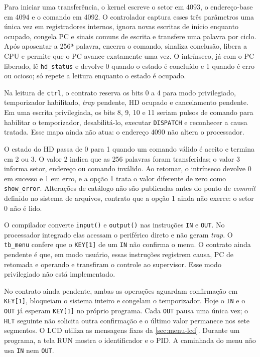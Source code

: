 \documentclass[
    12pt,
    openright,
    a4paper,
    english,
    brazilian
]{abntex2}
\begin{document}
Para iniciar uma transferência, o kernel escreve o setor em 4093, o endereço-base em 4094 e o comando em 4092. O controlador captura esses três parâmetros uma única vez em registradores internos, ignora novas escritas de início enquanto ocupado, congela PC e sinais comuns de escrita e transfere uma palavra por ciclo. Após aposentar a 256ª palavra, encerra o comando, sinaliza conclusão, libera a CPU e permite que o PC avance exatamente uma vez. O intrínseco, já com o PC liberado, lê \texttt{hd\_status} e devolve 0 quando o estado é concluído e 1 quando é erro ou ocioso; só repete a leitura enquanto o estado é ocupado.

Na leitura de \texttt{ctrl}, o contrato reserva os bits 0 a 4 para modo privilegiado, temporizador habilitado, \emph{trap} pendente, HD ocupado e cancelamento pendente. Em uma escrita privilegiada, os bits 8, 9, 10 e 11 seriam pulsos de comando para habilitar o temporizador, desabilitá-lo, executar \texttt{DISPATCH} e reconhecer a causa tratada. Esse mapa ainda não atua: o endereço 4090 não altera o processador.

O estado do HD passa de 0 para 1 quando um comando válido é aceito e termina em 2 ou 3. O valor 2 indica que as 256 palavras foram transferidas; o valor 3 informa setor, endereço ou comando inválido. Ao retomar, o intrínseco devolve 0 em sucesso e 1 em erro, e a opção 1 trata o valor diferente de zero como \texttt{show\_error}. Alterações de catálogo não são publicadas antes do ponto de \emph{commit} definido no sistema de arquivos, contrato que a opção 1 ainda não exerce: o setor 0 não é lido.

O compilador converte \texttt{input()} e \texttt{output()} nas instruções \texttt{IN} e \texttt{OUT}. No processador integrado elas acessam o periférico direto e não geram \emph{trap}. O \texttt{tb\_menu} confere que o \texttt{KEY[1]} de um \texttt{IN} não confirma o menu. O contrato ainda pendente é que, em modo usuário, essas instruções registrem causa, PC de retomada e operando e transfiram o controle ao supervisor. Esse modo privilegiado não está implementado.

No contrato ainda pendente, ambas as operações aguardam confirmação em \texttt{KEY[1]}, bloqueiam o sistema inteiro e congelam o temporizador. Hoje o \texttt{IN} e o \texttt{OUT} já esperam \texttt{KEY[1]} no próprio programa. Cada \texttt{OUT} pausa uma única vez; o \texttt{HLT} seguinte não solicita outra confirmação e o último valor permanece nos sete segmentos. O LCD utiliza as mensagens fixas da \autoref{sec:menu-lcd}. Durante um programa, a tela RUN mostra o identificador e o PID. A caminhada do menu não usa \texttt{IN} nem \texttt{OUT}.
\end{document}
